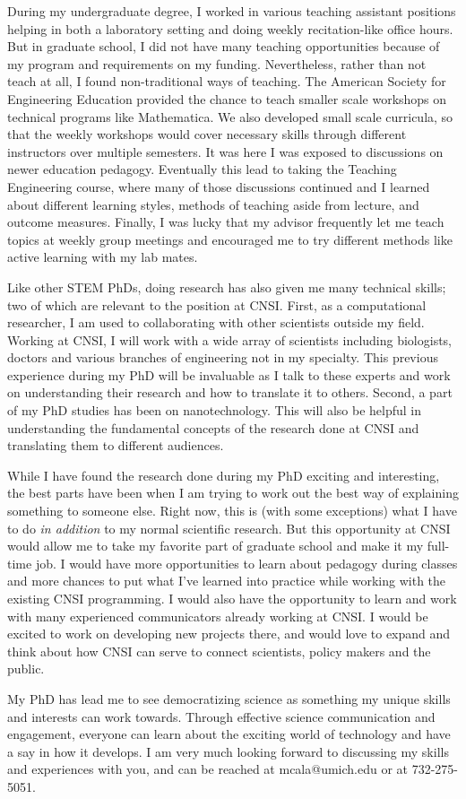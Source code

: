 During my undergraduate degree, I worked in various teaching assistant positions helping in both a laboratory setting and doing weekly recitation-like office hours. But in graduate school, I did not have many teaching opportunities because of my program and requirements on my funding. Nevertheless, rather than not teach at all, I found non-traditional ways of teaching. The American Society for Engineering Education provided the chance to teach smaller scale workshops on technical programs like Mathematica. We also developed small scale curricula, so that the weekly workshops would cover necessary skills through different instructors over multiple semesters. It was here I was exposed to discussions on newer education pedagogy. Eventually this lead to taking the Teaching Engineering course, where many of those discussions continued and I learned about different learning styles, methods of teaching aside from lecture, and outcome measures. Finally, I was lucky that my advisor frequently let me teach topics at weekly group meetings and encouraged me to try different methods like active learning with my lab mates.

Like other STEM PhDs, doing research has also given me many technical skills; two of which are relevant to the position at CNSI. First, as a computational researcher, I am used to collaborating with other scientists outside my field. Working at CNSI, I will work with a wide array of scientists including biologists, doctors and various branches of engineering not in my specialty. This previous experience during my PhD will be invaluable as I talk to these experts and work on understanding their research and how to translate it to others. Second, a part of my PhD studies has been on nanotechnology. This will also be helpful in understanding the fundamental concepts of the research done at CNSI and translating them to different audiences.

While I have found the research done during my PhD exciting and interesting, the best parts have been when I am trying to work out the best way of explaining something to someone else. Right now, this is (with some exceptions) what I have to do \textit{in addition} to my normal scientific research. But this opportunity at CNSI would allow me to take my favorite part of graduate school and make it my full-time job. I would have more opportunities to learn about pedagogy during classes and more chances to put what I've learned into practice while working with the existing CNSI programming. I would also have the opportunity to learn and work with many experienced communicators already working at CNSI. I would be excited to work on developing new projects there, and would love to expand and think about how CNSI can serve to connect scientists, policy makers and the public. 

My PhD has lead me to see democratizing science as something my unique skills and interests can work towards. Through effective science communication and engagement, everyone can learn about the exciting world of technology and have a say in how it develops. I am very much looking forward to discussing my skills and experiences with you, and can be reached at mcala@umich.edu or at 732-275-5051.
\thispagestyle{empty}

\makeletterclosing
